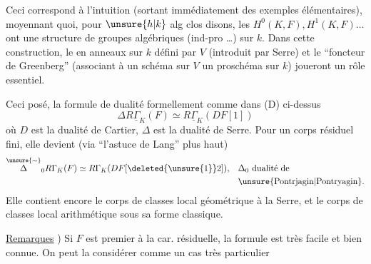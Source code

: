 Ceci correspond à l'intuition (sortant immédiatement des exemples élémentaires), moyennant quoi, pour $\unsure{h|k}$ alg clos disons, les $H^0(K,F), H^1(K,F)\ldots$ ont une structure de groupes algébriques (ind-pro \ldots) sur $k$. Dans cette construction, le  en anneaux sur $k$ défini par $V$ (introduit par Serre) et le ``foncteur de Greenberg'' (associant à un schéma sur $V$ un proschéma sur $k$) joueront un rôle essentiel.

Ceci posé, la formule de dualité  formellement comme dans (D) ci-dessus
\[
 \Delta R\underline{\Gamma}_K(F)\simeq R\underline{\Gamma}_K(DF[1])
\]
où $D$ est la dualité de Cartier, $\Delta$ est la dualité de Serre. Pour un corps résiduel fini, elle devient (via ``l'astuce de Lang'' plus haut)
\[
 \begin{aligned}
 \overset{\unsure{\sim}}{\Delta}_0 R\Gamma_K(F)\simeq R\Gamma_K(DF[\deleted{\unsure{1}}2]),&\quad \Delta_0\ \text{dualité de}\\
 &\quad\text{\unsure{Pontrjagin|Pontryagin}.}
 \end{aligned}
\]
Elle contient encore le corps de classes local géométrique à la Serre, et le corps de classes local arithmétique sous sa forme classique.

\uline{Remarques} ) Si $F$ est premier à la car. résiduelle, la formule est très facile et bien connue. On peut la considérer comme un cas très particulier
